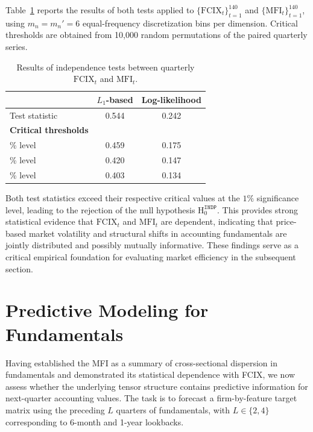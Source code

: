 \documentclass[pdflatex,sn-mathphys-num]{sn-jnl}%
\theoremstyle{thmstyleone}%
\theoremstyle{thmstyletwo}%
\theoremstyle{thmstylethree}%
\begin{document}
Table~\ref{Independence_Test} reports the results of both tests applied to $\{\mathrm{FCIX}_t\}_{t=1}^{140}$ and $\{\mathrm{MFI}_t\}_{t=1}^{140}$, using $m_n = m_n' = 6$ equal-frequency discretization bins per dimension. Critical thresholds are obtained from 10,000 random permutations of the paired quarterly series.

\begin{table}[ht]
	\centering
	\caption{Results of independence tests between quarterly $\mathrm{FCIX}_t$ and $\mathrm{MFI}_t$.}
	\label{Independence_Test}
	\begin{tabular}{lcc}
		\toprule
		& $L_1$-based & Log-likelihood \\
		\midrule
		Test statistic & 0.544 & 0.242 \\
		\addlinespace
		\textbf{Critical thresholds} & & \\
		\quad 1\% level   & 0.459 & 0.175 \\
		\quad 5\% level   & 0.420 & 0.147 \\
		\quad 10\% level  & 0.403 & 0.134 \\
		\bottomrule
	\end{tabular}
\end{table}

Both test statistics exceed their respective critical values at the $1\%$ significance level, leading to the rejection of the null hypothesis $\mathrm{H}_0^{\mathtt{INDP}}$. This provides strong statistical evidence that $\mathrm{FCIX}_t$ and $\mathrm{MFI}_t$ are dependent, indicating that price-based market volatility and structural shifts in accounting fundamentals are jointly distributed and possibly mutually informative. These findings serve as a critical empirical foundation for evaluating market efficiency in the subsequent section.






\section{Predictive Modeling for Fundamentals}
\label{Section:Predictive_Fundamentals}

Having established the MFI as a summary of cross-sectional dispersion in fundamentals and demonstrated its statistical dependence with FCIX, we now assess whether the underlying tensor structure contains predictive information for next-quarter accounting values. The task is to forecast a firm-by-feature target matrix using the preceding $L$ quarters of fundamentals, with $L \in \{2,4\}$ corresponding to 6-month and 1-year lookbacks.
\end{document}
